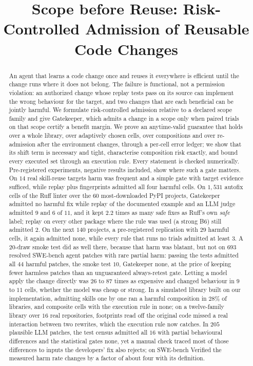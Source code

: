 \documentclass[acmsmall,screen,review,anonymous]{acmart}
\theoremstyle{acmdefinition}
\begin{document}
\title{Scope before Reuse: Risk-Controlled Admission of Reusable Code Changes}
\begin{abstract}
An agent that learns a code change once and reuses it everywhere is efficient until the change runs where it does not belong.  The
failure is functional, not a permission violation: an authorized change whose replay tests pass on its source can implement the wrong
behaviour for the target, and two changes that are each beneficial can be jointly harmful.  We formulate risk-controlled admission
relative to a declared scope family and give Gatekeeper, which admits a change in a scope only when paired trials on that scope certify
a benefit margin.  We prove an anytime-valid guarantee that holds over a whole library, over adaptively chosen cells, over compositions
and over re-admission after the environment changes, through a per-cell error ledger; we show that its shift term is necessary and
tight, characterise composition risk exactly, and bound every executed set through an execution rule.  Every statement is checked
numerically.  Pre-registered experiments, negative results included, show where such a gate matters.  On $14$ real skill-reuse targets harm was
frequent and a simple gate with target evidence sufficed, while replay plus fingerprints admitted all four harmful cells.  On
$1{,}531$ autofix cells of the Ruff linter over the $60$ most-downloaded PyPI projects, Gatekeeper admitted no harmful fix while replay
of the documented example and an LLM judge admitted $9$ and $6$ of $11$, and it kept $2.2$ times as many safe fixes as Ruff's own
\emph{safe} label; replay on every other package where the rule was used (a strong B6) still admitted $2$.  On the next $140$
projects, a pre-registered replication with $29$ harmful cells, it again admitted none, while every rule that runs no trials
admitted at least $3$.  A $20$-draw smoke
test did as well there, because that harm was blatant, but not on $693$ resolved SWE-bench agent patches with rare partial harm:
passing the tests admitted all $44$ harmful patches, the smoke test $10$, Gatekeeper none, at the price of keeping fewer harmless
patches than an unguaranteed always-retest gate.  Letting a model apply the change directly was $26$ to $87$ times as expensive and changed
behaviour in $9$ to $11$ cells, whether the model was cheap or strong.  In a
simulated library built on our implementation, admitting skills one by one ran a harmful composition in $28\%$ of libraries, and
composite cells with the execution rule in none; on a twelve-family library over $16$ real repositories, footprints read off the
original code missed a real interaction between two rewrites, which the execution rule now catches.  In $205$ plausible LLM patches, the test census admitted all $16$ with partial
behavioural differences and the statistical gates none, yet a manual check traced most of those differences to inputs the developers'
fix also rejects; on SWE-bench Verified the measured harm rate changes by a factor of about four with its definition.
\end{abstract}
\end{document}
